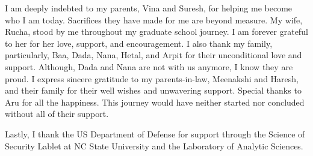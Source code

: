 \begin{acknowledgements}
I am deeply indebted to my parents, Vina and Suresh, for helping me become who I am today. 
Sacrifices they have made for me are beyond measure. 
My wife, Rucha, stood by me throughout my graduate school journey. 
I am forever grateful to her for her love, support, and encouragement. 
I also thank my family, particularly, Baa, Dada, Nana, Hetal, and Arpit for their unconditional love and support. 
Although, Dada and Nana are not with us anymore, I know they are proud. 
I express sincere gratitude to my parents-in-law, Meenakshi and Haresh, and their family for their well wishes and unwavering support. 
Special thanks to Aru for all the happiness. 
This journey would have neither started nor concluded without all of their support. 

Lastly, I thank the US Department of Defense for support through the
Science of Security Lablet at NC State University and the Laboratory of Analytic Sciences.

\end{acknowledgements}

\thesistableofcontents

\thesislistoftables

\thesislistoffigures